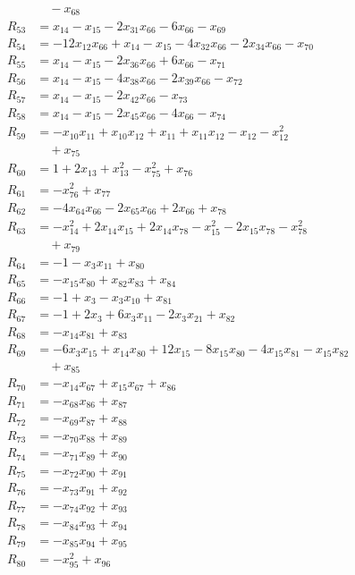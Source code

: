 \begin{align*}
&\quad{}-x_{68}\\
R_{53}&=x_{14}-x_{15}-2x_{31}x_{66}-6x_{66}-x_{69}\\
R_{54}&=-12x_{12}x_{66}+x_{14}-x_{15}-4x_{32}x_{66}-2x_{34}x_{66}-x_{70}\\
R_{55}&=x_{14}-x_{15}-2x_{36}x_{66}+6x_{66}-x_{71}\\
R_{56}&=x_{14}-x_{15}-4x_{38}x_{66}-2x_{39}x_{66}-x_{72}\\
R_{57}&=x_{14}-x_{15}-2x_{42}x_{66}-x_{73}\\
R_{58}&=x_{14}-x_{15}-2x_{45}x_{66}-4x_{66}-x_{74}\\
R_{59}&=-x_{10}x_{11}+x_{10}x_{12}+x_{11}+x_{11}x_{12}-x_{12}-x_{12}^{2}\\
&\quad{}+x_{75}\\
R_{60}&=1+2x_{13}+x_{13}^{2}-x_{75}^{2}+x_{76}\\
R_{61}&=-x_{76}^{2}+x_{77}\\
R_{62}&=-4x_{64}x_{66}-2x_{65}x_{66}+2x_{66}+x_{78}\\
R_{63}&=-x_{14}^{2}+2x_{14}x_{15}+2x_{14}x_{78}-x_{15}^{2}-2x_{15}x_{78}-x_{78}^{2}\\
&\quad{}+x_{79}\\
R_{64}&=-1-x_{3}x_{11}+x_{80}\\
R_{65}&=-x_{15}x_{80}+x_{82}x_{83}+x_{84}\\
R_{66}&=-1+x_{3}-x_{3}x_{10}+x_{81}\\
R_{67}&=-1+2x_{3}+6x_{3}x_{11}-2x_{3}x_{21}+x_{82}\\
R_{68}&=-x_{14}x_{81}+x_{83}\\
R_{69}&=-6x_{3}x_{15}+x_{14}x_{80}+12x_{15}-8x_{15}x_{80}-4x_{15}x_{81}-x_{15}x_{82}\\
&\quad{}+x_{85}\\
R_{70}&=-x_{14}x_{67}+x_{15}x_{67}+x_{86}\\
R_{71}&=-x_{68}x_{86}+x_{87}\\
R_{72}&=-x_{69}x_{87}+x_{88}\\
R_{73}&=-x_{70}x_{88}+x_{89}\\
R_{74}&=-x_{71}x_{89}+x_{90}\\
R_{75}&=-x_{72}x_{90}+x_{91}\\
R_{76}&=-x_{73}x_{91}+x_{92}\\
R_{77}&=-x_{74}x_{92}+x_{93}\\
R_{78}&=-x_{84}x_{93}+x_{94}\\
R_{79}&=-x_{85}x_{94}+x_{95}\\
R_{80}&=-x_{95}^{2}+x_{96}\\

\end{align*}
